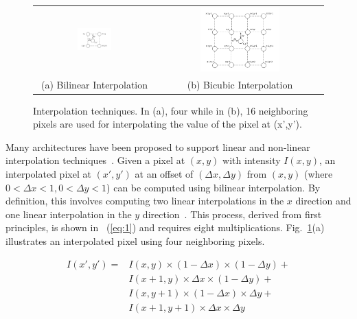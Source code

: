 \begin{figure}[!htb]
\centering
\begin{tabular}{@{}c@{} @{}c@{}}
\includegraphics[width=0.3\textwidth]{./figures/bilinear.pdf} & \includegraphics[width=0.5\textwidth]{./figures/bicubic.pdf}\\[\abovecaptionskip]
\small (a) Bilinear Interpolation & \small (b) Bicubic Interpolation
\end{tabular}
\vspace{1pt}
\caption{Interpolation techniques. In (a), four while in (b), 16 neighboring pixels are used for interpolating the value of the pixel at (x',y').}
\label{tab:interpolation}
\end{figure}

Many architectures have been proposed to support linear 
and non-linear interpolation techniques~\cite{kesturdac}.
Given a pixel at $(x,y)$ with intensity $I(x,y)$, an interpolated pixel at $(x',y')$ at an offset of $(\Delta x, \Delta y)$ from $(x,y)$
(where $0<\Delta x<1, 0<\Delta y<1$) can be computed using bilinear interpolation.
By definition, this involves computing two linear interpolations in the $x$ direction and one linear interpolation in the $y$ direction~\cite{IPHandbook}. 
This process, derived from first principles, is shown in ~(\ref{eq:1}) and requires eight multiplications. 
Fig.~\ref{tab:interpolation}(a) illustrates an interpolated pixel using four neighboring pixels.

\begin{equation}
\begin{split}
I(x',y') = &I(x,y) \times (1-\Delta x) \times (1-\Delta y) +\\ 
            &I(x+1,y) \times\Delta x \times (1-\Delta y) +\\ 
            &I(x,y+1) \times (1-\Delta x) \times\Delta y +\\ 
            &I(x+1,y+1) \times\Delta x \times\Delta y 
\end{split}
\label{eq:1}
\end{equation}

